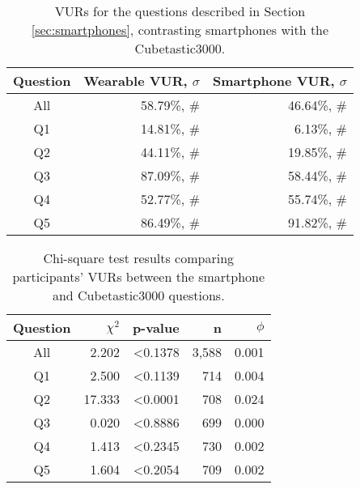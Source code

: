\begin{table}[t]
\begin{center}
\begin{tabular}{| c | r | r |}
\hline
 Question &  Wearable VUR, $\sigma$ & Smartphone VUR, $\sigma$ \\
 \hline
 All & 58.79\%, \# & 46.64\%, \# \\
Q1 & 14.81\%,  \# &  6.13\%, \# \\
Q2 & 44.11\%, \# &  19.85\%, \# \\
Q3 & 87.09\%, \# &  58.44\%, \# \\
Q4 & 52.77\%, \# & 55.74\%, \# \\
Q5 & 86.49\%, \# &  91.82\%, \# \\ 
\hline
\end{tabular}
\caption{VURs for the questions described in Section \ref{sec:smartphones}, contrasting smartphones with the Cubetastic3000.}
\label{deviceVUR}
\end{center}
\end{table}

\begin{table}%
\begin{center}
\begin{tabular}{|c|r|r|r|r|}
\hline
Question & $\chi^2$ & p-value & n & $\phi$ \\
\hline
All & 2.202 & <0.1378 & 3,588 & 0.001\\
Q1 & 2.500 & <0.1139 & 714 & 0.004\\
Q2 & 17.333 & <0.0001 & 708 &  0.024\\
Q3 & 0.020 & <0.8886 & 699 &  0.000\\
Q4 & 1.413 & <0.2345 & 730& 0.002\\
Q5 & 1.604 & <0.2054 & 709 & 0.002\\
\hline
\end{tabular}
\caption{Chi-square test results comparing participants' VURs between the smartphone and Cubetastic3000 questions.}
\label{betweendevice}
\end{center}
\end{table}
						
